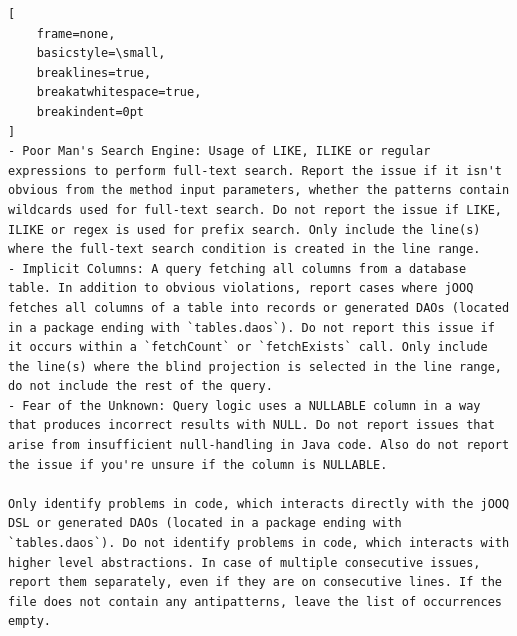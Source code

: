 \bigskip %
\bigskip %

\begingroup %
\captionsetup{type=figure}
{}\label{fig:dmlDqlInstructions}
\begin{lstlisting}[
    frame=none, 
    basicstyle=\small, 
    breaklines=true, 
    breakatwhitespace=true, 
    breakindent=0pt
]
- Poor Man's Search Engine: Usage of LIKE, ILIKE or regular expressions to perform full-text search. Report the issue if it isn't obvious from the method input parameters, whether the patterns contain wildcards used for full-text search. Do not report the issue if LIKE, ILIKE or regex is used for prefix search. Only include the line(s) where the full-text search condition is created in the line range.
- Implicit Columns: A query fetching all columns from a database table. In addition to obvious violations, report cases where jOOQ fetches all columns of a table into records or generated DAOs (located in a package ending with `tables.daos`). Do not report this issue if it occurs within a `fetchCount` or `fetchExists` call. Only include the line(s) where the blind projection is selected in the line range, do not include the rest of the query.
- Fear of the Unknown: Query logic uses a NULLABLE column in a way that produces incorrect results with NULL. Do not report issues that arise from insufficient null-handling in Java code. Also do not report the issue if you're unsure if the column is NULLABLE.

Only identify problems in code, which interacts directly with the jOOQ DSL or generated DAOs (located in a package ending with `tables.daos`). Do not identify problems in code, which interacts with higher level abstractions. In case of multiple consecutive issues, report them separately, even if they are on consecutive lines. If the file does not contain any antipatterns, leave the list of occurrences empty.
\end{lstlisting}

\nopagebreak
\begin{minipage}{\linewidth}
\end{minipage}
\par %
\endgroup %

